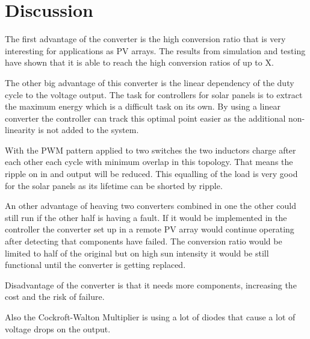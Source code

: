\chapter{Discussion}\label{ch:Discussion}


The first advantage of the converter is the high conversion ratio that is very interesting for applications as PV arrays. The results from simulation and testing have shown that it is able to reach the high conversion ratios of up to X.


The other big advantage of this converter is the linear dependency of the duty cycle to the voltage output. The task for controllers for solar panels is to extract the maximum energy which is a difficult task on its own. 
By using a linear converter the controller can track this optimal point easier as the additional non-linearity is not added to the system.


With the PWM pattern applied to two switches the two inductors charge after each other each cycle with minimum overlap in this topology. 
That means the ripple on in and output will be reduced. This equalling of the load is very good for the solar panels as its lifetime can be shorted by ripple. %

An other advantage of heaving two converters combined in one the other could still run if the other half is having a fault. 
If it would be implemented in the controller the converter set up in a remote PV array would continue operating after detecting that components have failed. 
The conversion ratio would be limited to half of the original but on high sun intensity it would be still functional until the converter is getting replaced.


Disadvantage of the converter is that it needs more components, increasing the cost and the risk of failure.

Also the Cockroft-Walton Multiplier is using a lot of diodes that cause a lot of voltage drops on the output.